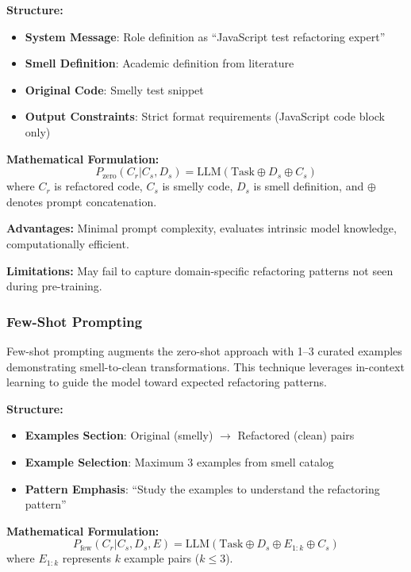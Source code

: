 \documentclass[12pt]{article}
\begin{document}
\textbf{Structure:}
\begin{itemize}
    \item \textbf{System Message}: Role definition as ``JavaScript test refactoring expert''
    \item \textbf{Smell Definition}: Academic definition from literature
    \item \textbf{Original Code}: Smelly test snippet
    \item \textbf{Output Constraints}: Strict format requirements (JavaScript code block only)
\end{itemize}

\textbf{Mathematical Formulation:}
\begin{equation}
    P_{\text{zero}}(C_r | C_s, D_s) = \text{LLM}(\text{Task} \oplus D_s \oplus C_s)
\end{equation}
where $C_r$ is refactored code, $C_s$ is smelly code, $D_s$ is smell definition, and $\oplus$ denotes prompt concatenation.

\textbf{Advantages:} Minimal prompt complexity, evaluates intrinsic model knowledge, computationally efficient.

\textbf{Limitations:} May fail to capture domain-specific refactoring patterns not seen during pre-training.

\subsubsection{Few-Shot Prompting}

Few-shot prompting augments the zero-shot approach with 1--3 curated examples demonstrating smell-to-clean transformations. This technique leverages in-context learning to guide the model toward expected refactoring patterns.

\textbf{Structure:}
\begin{itemize}
    \item \textbf{Examples Section}: Original (smelly) $\rightarrow$ Refactored (clean) pairs
    \item \textbf{Example Selection}: Maximum 3 examples from smell catalog
    \item \textbf{Pattern Emphasis}: ``Study the examples to understand the refactoring pattern''
\end{itemize}

\textbf{Mathematical Formulation:}
\begin{equation}
    P_{\text{few}}(C_r | C_s, D_s, E) = \text{LLM}(\text{Task} \oplus D_s \oplus E_{1:k} \oplus C_s)
\end{equation}
where $E_{1:k}$ represents $k$ example pairs ($k \leq 3$).
\end{document}

